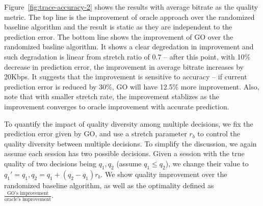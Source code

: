 Figure~\ref{fig:trace-accuracy-2} shows the results with average bitrate as the quality metric. The top line is the improvement of oracle approach over the randomized baseline algorithm and the result is static as they are independent to the prediction error. The bottom line shows the improvement of GO over the randomized basline algorithm. 
It shows a clear degredation in improvement and such degradation is linear from stretch ratio of 0.7 -- after this point, with 10\% decrease in prediction error, the improvement in average bitrate increases by 20Kbps. It suggests that the improvement is sensitive to accuracy -- if current prediction error is reduced by 30\%, GO will have 12.5\% more improvement. Also, note that with smaller stretch rate, the improvement stablizes as the improvement converges to oracle improvement with accurate prediction.



\label{subsec:impact-diversity}

To quantify the impact of quality diversity among multiple decisions, we fix the prediction error given by GO, and use a stretch parameter $r_b$ to control the quality diversity between multiple decisions. To simplify the discussion, we again assume each session has two possible decisions. Given a session with the true quality of two decisions being $q_1, q_2$ (assume $q_1\leq q_2$), we change their value to $q_1'=q_1, q_2=q_1+(q_2-q_1)r_b$. We show quality improvement over the randomized baseline algorithm, as well as the optimality defined as $\frac{\textrm{GO's improvement}}{\textrm{oracle's improvement}}$.


